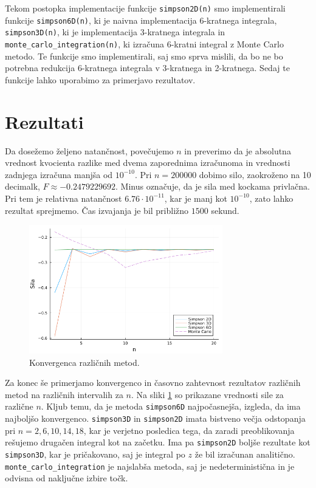 \documentclass[11pt, titlepage]{article}
\begin{document}
Tekom postopka implementacije funkcije \texttt{simpson2D(n)} smo implementirali funkcije \texttt{simpson6D(n)}, ki je naivna implementacija 6-kratnega integrala, \texttt{simpson3D(n)}, ki je implementacija 3-kratnega integrala in \texttt{monte\_carlo\_integration(n)}, ki izračuna 6-kratni integral z Monte Carlo metodo.
Te funkcije smo implementirali, saj smo sprva mislili, da bo ne bo potrebna redukcija 6-kratnega integrala v 3-kratnega in 2-kratnega. Sedaj te funkcije lahko uporabimo za primerjavo rezultatov.

\section{Rezultati}
Da dosežemo željeno natančnost, povečujemo $n$ in preverimo da je absolutna vrednost kvocienta razlike med dvema zaporednima izračunoma in vrednosti zadnjega izračuna manjša od $10^{-10}$. Pri $n=200000$ dobimo silo, zaokroženo na 10 decimalk, $F\approx-0.2479229692$. Minus označuje, da je sila med kockama privlačna.
Pri tem je relativna natančnost $6.76 \cdot 10^{-11}$, kar je manj kot $10^{-10}$, zato lahko rezultat sprejmemo. Čas izvajanja je bil približno $1500$ sekund.

\begin{figure}[H]
    \centering
    \includegraphics[width=0.75\textwidth]{figures/force_convergence.png}
    \caption{Konvergenca različnih metod.}
    \label{fig:convergence}
\end{figure}
Za konec še primerjamo konvergenco in časovno zahtevnost rezultatov različnih metod na različnih intervalih za $n$. Na sliki \ref{fig:convergence} so prikazane vrednosti sile za različne $n$.
Kljub temu, da je metoda \texttt{simpson6D} najpočasnejša, izgleda, da ima najboljšo konvergenco. \texttt{simpson3D} in \texttt{simpson2D} imata bistveno večja odstopanja pri $n=2,6,10,14,18$, kar je verjetno posledica tega, da zaradi preoblikovanja rešujemo drugačen integral kot na začetku. Ima pa \texttt{simpson2D} boljše rezultate kot \texttt{simpson3D}, kar je pričakovano,
saj je integral po $z$ že bil izračunan analitično. \texttt{monte\_carlo\_integration} je najslabša metoda, saj je nedeterministična in je odvisna od naključne izbire točk.
\end{document}

